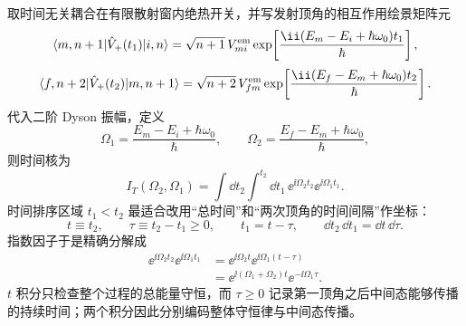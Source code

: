 \begin{derivation}
取时间无关耦合在有限散射窗内绝热开关，并写发射顶角的相互作用绘景矩阵元
\[
\langle m,n+1|\hat V_+(t_1)|i,n\rangle
=\sqrt{n+1}\,V^{\rm em}_{mi}
\exp\!\left[
\frac{\ii(E_m-E_i+\hbar\omega_0)t_1}{\hbar}
\right],
\]
\[
\langle f,n+2|\hat V_+(t_2)|m,n+1\rangle
=\sqrt{n+2}\,V^{\rm em}_{fm}
\exp\!\left[
\frac{\ii(E_f-E_m+\hbar\omega_0)t_2}{\hbar}
\right].
\]
代入二阶 Dyson 振幅，定义
\[
\Omega_1=\frac{E_m-E_i+\hbar\omega_0}{\hbar},
\qquad
\Omega_2=\frac{E_f-E_m+\hbar\omega_0}{\hbar},
\]
则时间核为
\[
I_T(\Omega_2,\Omega_1)
=\int\dd t_2\int^{t_2}\dd t_1\,
\ee^{\ii\Omega_2t_2}\ee^{\ii\Omega_1t_1}.
\]
时间排序区域 $t_1<t_2$ 最适合改用“总时间”和“两次顶角的时间间隔”作坐标：
\begin{equation*}
 t\equiv t_2,
 \qquad
 \tau\equiv t_2-t_1\ge0,
 \qquad
 t_1=t-\tau,
 \qquad
 \dd t_2\,\dd t_1=\dd t\,\dd\tau.
\end{equation*}
指数因子于是精确分解成
\begin{align*}
 \ee^{\ii\Omega_2t_2}\ee^{\ii\Omega_1t_1}
 &=\ee^{\ii\Omega_2t}
   \ee^{\ii\Omega_1(t-\tau)}\\
 &=\ee^{\ii(\Omega_1+\Omega_2)t}
   \ee^{-\ii\Omega_1\tau}.
\end{align*}
$t$ 积分只检查整个过程的总能量守恒，而 $\tau\ge0$ 记录第一顶角之后中间态能够传播的持续时间；两个积分因此分别编码整体守恒律与中间态传播。


\end{derivation}
